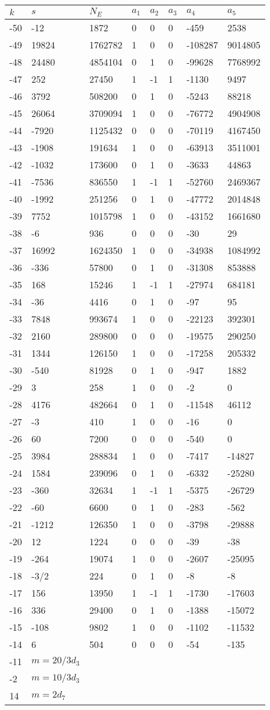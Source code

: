 \documentclass{amsart}
\begin{document}
\begin{longtable}{|l|l|l|lllll|}
\hline
$k$ & $s$ & $N_E$ & $a_1$ & $a_2$ & $a_3$ & $a_4$ & $a_5$\\
\hline
-50&-12&1872&0&0&0&-459&2538\\
-49&19824&1762782&1&0&0&-108287&9014805\\
-48&24480&4854104&0&1&0&-99628&7768992\\
-47&252&27450&1&-1&1&-1130&9497\\
-46&3792&508200&0&1&0&-5243&88218\\
-45&26064&3709094&1&0&0&-76772&4904908\\
-44&-7920&1125432&0&0&0&-70119&4167450\\
-43&-1908&191634&1&0&0&-63913&3511001\\
-42&-1032&173600&0&1&0&-3633&44863\\
-41&-7536&836550&1&-1&1&-52760&2469367\\
-40&-1992&251256&0&1&0&-47772&2014848\\
-39&7752&1015798&1&0&0&-43152&1661680\\
-38&-6&936&0&0&0&-30&29\\
-37&16992&1624350&1&0&0&-34938&1084992\\
-36&-336&57800&0&1&0&-31308&853888\\
-35&168&15246&1&-1&1&-27974&684181\\
-34&-36&4416&0&1&0&-97&95\\
-33&7848&993674&1&0&0&-22123&392301\\
-32&2160&289800&0&0&0&-19575&290250\\
-31&1344&126150&1&0&0&-17258&205332\\
-30&-540&81928&0&1&0&-947&1882\\
-29&3&258&1&0&0&-2&0\\
-28&4176&482664&0&1&0&-11548&46112\\
-27&-3&410&1&0&0&-16&0\\
-26&60&7200&0&0&0&-540&0\\
-25&3984&288834&1&0&0&-7417&-14827\\
-24&1584&239096&0&1&0&-6332&-25280\\
-23&-360&32634&1&-1&1&-5375&-26729\\
-22&-60&6600&0&1&0&-283&-562\\
-21&-1212&126350&1&0&0&-3798&-29888\\
-20&12&1224&0&0&0&-39&-38\\
-19&-264&19074&1&0&0&-2607&-25095\\
-18&-3/2&224&0&1&0&-8&-8\\
-17&156&13950&1&-1&1&-1730&-17603\\
-16&336&29400&0&1&0&-1388&-15072\\
-15&-108&9802&1&0&0&-1102&-11532\\
-14&6&504&0&0&0&-54&-135\\
-11&$m=20/3d_{3}$&&\multicolumn{5}{c|}{}\\
-2&$m=10/3d_{3}$&&\multicolumn{5}{c|}{}\\
14&$m=2d_{7}$&&\multicolumn{5}{c|}{}\\
\hline
\end{longtable}
\end{document}

